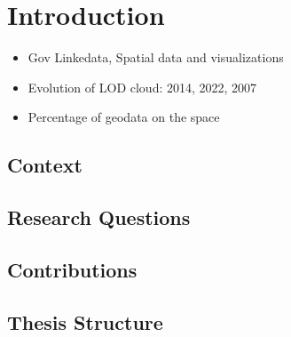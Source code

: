 \chapter{Introduction}
\label{intro}

\begin{itemize}
\item Gov Linkedata, Spatial data and visualizations
\item Evolution of LOD cloud: 2014, 2022, 2007
\item Percentage of geodata on the space
\end{itemize}

\section{Context}
\label{sec:context}

\section{Research Questions}
\label{sec:questions}

\section{Contributions}
\label{sec:contributions}

\section{Thesis Structure}
\label{sec:thesis-structure}